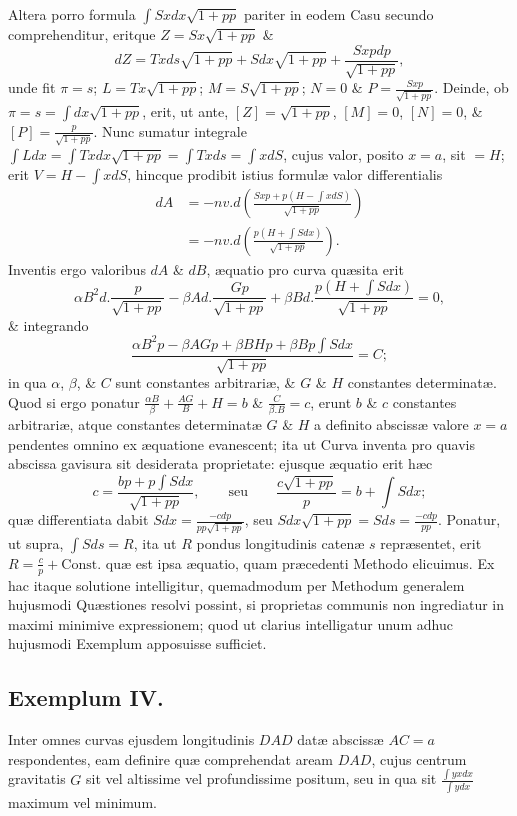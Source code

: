 Altera porro formula $\int Sxdx\sqrt{1+pp}$ pariter in eodem Casu secundo comprehenditur, eritque $Z=Sx\sqrt{1+pp}$ \&
\[dZ=Txds\sqrt{1+pp}+Sdx\sqrt{1+pp}+\frac{Sxpdp}{\sqrt{1+pp}},\]
unde fit $\pi=s$; $L=Tx\sqrt{1+pp}$; $M=S\sqrt{1+pp}$;
$N=0$ \& $P=\frac{Sxp}{\sqrt{1+pp}}$. Deinde, ob $\pi=s=\int dx\sqrt{1+pp}$, erit, ut ante, $[Z]=\sqrt{1+pp}$, $[M]=0$, $[N]=0$, \& $[P]=\frac p{\sqrt{1+pp}}$. Nunc sumatur integrale $\int Ldx=\int Txdx\sqrt{1+pp}=\int Txds=\int xdS$, cujus valor, posito $x=a$, sit $=H$; erit $V=H-\int xdS$, hincque prodibit istius formulæ valor differentialis
\[\begin{aligned}dA&=-nv.d\left(\frac{Sxp+p(H-\int xdS)}{\sqrt{1+pp}}\right)\\&=-nv.d\left(\frac{p(H+\int Sdx)}{\sqrt{1+pp}}\right).\end{aligned}\]
Inventis ergo valoribus $dA$ \& $dB$, æquatio pro curva quæsita erit
\[\alpha B^2d.\frac p{\sqrt{1+pp}}-\beta Ad.\frac{Gp}{\sqrt{1+pp}}+\beta Bd.\frac{p(H+\int Sdx)}{\sqrt{1+pp}}=0,\]
\& integrando
\[\frac{\alpha B^2p-\beta AGp+\beta BHp+\beta Bp\int Sdx}{\sqrt{1+pp}}=C;\]
in qua $\alpha$, $\beta$, \& $C$ sunt constantes arbitrariæ, \& $G$ \& $H$ constantes determinatæ. Quod si ergo ponatur $\frac{\alpha B}{\beta}+\frac{AG}{B}+H=b$ \& $\frac C{\beta.B}=c$, erunt $b$ \& $c$ constantes arbitrariæ, atque constantes determinatæ $G$ \& $H$ a definito abscissæ valore $x=a$ pendentes omnino ex æquatione evanescent; ita ut Curva inventa pro quavis abscissa gavisura sit desiderata proprietate: ejusque æquatio erit hæc
\[c=\frac{bp+p\int Sdx}{\sqrt{1+pp}},\qquad\text{seu}\qquad\frac{c\sqrt{1+pp}}p=b+\int Sdx;\]
quæ differentiata dabit $Sdx=\frac{-cdp}{pp\sqrt{1+pp}}$, seu $Sdx\sqrt{1+pp}=Sds=\frac{-cdp}{pp}$. Ponatur, ut supra, $\int Sds=R$, ita ut $R$ pondus longitudinis catenæ $s$ repræsentet, erit $R=\frac cp+\text{Const.}$ quæ est ipsa æquatio, quam præcedenti Methodo elicuimus. Ex hac itaque solutione intelligitur, quemadmodum per Methodum generalem hujusmodi Quæstiones resolvi possint, si proprietas communis non ingrediatur in maximi minimive expressionem; quod ut clarius intelligatur unum adhuc hujusmodi Exemplum apposuisse sufficiet.

\subsection*{Exemplum IV.}
Inter omnes curvas ejusdem longitudinis $DAD$ datæ abscissæ $AC=a$ respondentes, eam definire quæ comprehendat aream $DAD$, cujus centrum gravitatis $G$ sit vel altissime vel profundissime positum, seu in qua sit $\frac{\int yxdx}{\int ydx}$ maximum vel minimum.

